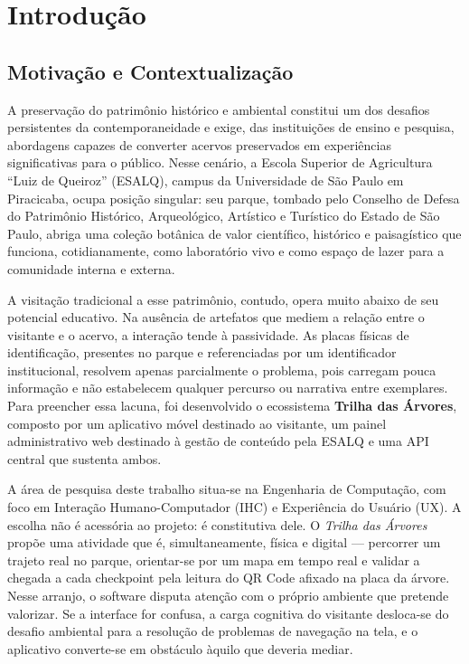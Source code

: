 \chapter{Introdução}
\label{cap:introducao}

\section{Motivação e Contextualização}
\label{sec:motivacao}

A preservação do patrimônio histórico e ambiental constitui um dos desafios
persistentes da contemporaneidade e exige, das instituições de ensino e pesquisa,
abordagens capazes de converter acervos preservados em experiências
significativas para o público. Nesse cenário, a Escola Superior de Agricultura
``Luiz de Queiroz'' (ESALQ), campus da Universidade de São Paulo em Piracicaba,
ocupa posição singular: seu parque, tombado pelo Conselho de Defesa do Patrimônio
Histórico, Arqueológico, Artístico e Turístico do Estado de São Paulo, abriga uma
coleção botânica de valor científico, histórico e paisagístico que funciona,
cotidianamente, como laboratório vivo e como espaço de lazer para a comunidade
interna e externa.

A visitação tradicional a esse patrimônio, contudo, opera muito abaixo de seu
potencial educativo. Na ausência de artefatos que mediem a relação entre o
visitante e o acervo, a interação tende à passividade. As placas
físicas de identificação, presentes no parque e referenciadas por um identificador
institucional, resolvem apenas parcialmente o
problema, pois carregam pouca informação e não estabelecem qualquer percurso ou
narrativa entre exemplares. Para preencher essa lacuna, foi desenvolvido o
ecossistema \textbf{Trilha das Árvores}, composto por um aplicativo móvel
destinado ao visitante, um painel administrativo web destinado à gestão de
conteúdo pela ESALQ e uma API central que sustenta ambos.

A área de pesquisa deste trabalho situa-se na Engenharia de Computação, com foco
em Interação Humano-Computador (IHC) e Experiência do Usuário (UX). A escolha não
é acessória ao projeto: é constitutiva dele. O \textit{Trilha das Árvores} propõe
uma atividade que é, simultaneamente, física e digital --- percorrer um trajeto
real no parque, orientar-se por um mapa em tempo real e validar a chegada a cada
checkpoint pela leitura do QR Code afixado na placa da árvore. Nesse arranjo, o
software disputa atenção com o próprio ambiente que pretende valorizar. Se a
interface for confusa, a carga cognitiva do visitante desloca-se do desafio
ambiental para a resolução de problemas de navegação na tela, e o aplicativo
converte-se em obstáculo àquilo que deveria mediar.

